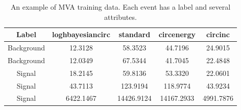 \documentclass[11pt]{cuthesis}
\begin{document}
\begin{table}
\begin{tabular}{| c | c | c | c | c |} 
 \hline
Label & loghbayesiancirc & standard & circenergy & circinc  \\ [0.5ex] 
 \hline\hline
Background & 12.3128 & 58.3523 & 44.7196 & 24.9015 \\ 
 \hline
Background & 12.0349 & 67.5344 & 41.7045 & 22.4848 \\
 \hline
Signal & 18.2145 & 59.8136 & 53.3320 & 22.0601 \\
 \hline
Signal & 43.7113 & 123.9194 & 118.9774 & 43.9234 \\
 \hline
Signal & 6422.1467 & 14426.9124 & 14167.2933 & 4991.7876 \\ [1ex] 
 \hline
 
\end{tabular}
\caption{An example of MVA training data. Each event has a label and several attributes.}
\label{table:1}
\end{table}
\end{document}
